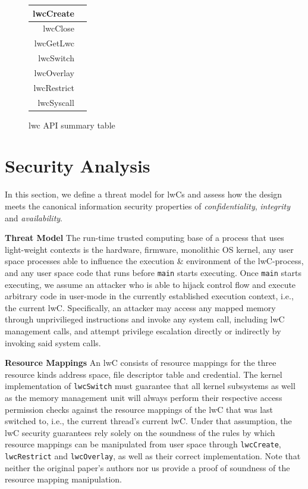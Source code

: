 \documentclass[10pt,twocolumn,letter]{article}
\begin{document}
\begin{figure}[h] %
\centering
\begin{tabular}{|r|m{1.5cm}|}
  \hline
  lwcCreate & \\
  \hline
  lwcClose & \\
  \hline
  lwcGetLwc & \\
  \hline
  lwcSwitch &  \\
  \hline
  lwcOverlay & \\
  \hline
  lwcRestrict & \\
  \hline
  lwcSyscall & \\
  \hline
\end{tabular}
  \caption{lwc API summary table}
\end{figure}


\section{Security Analysis}\label{design:threat}

In this section, we define a threat model for lwCs and assess how the design meets the canonical information security properties of \textit{confidentiality}, \textit{integrity} and \textit{availability}\cite{ciagoals}.

\textbf{Threat Model}\hspace{1em}
The run-time trusted computing base of a process that uses light-weight contexts is the
hardware,
firmware,
monolithic OS kernel,
any user space processes able to influence the execution \& environment of the lwC-process,
and any user space code that runs before \lstinline{main} starts executing.
Once \lstinline{main} starts executing, we assume an attacker who is able to hijack control flow and execute arbitrary code in user-mode in the currently established execution context, i.e., the current lwC.
Specifically, an attacker may access any mapped memory through unprivilieged instructions and invoke any system call, including lwC management calls, and attempt privilege escalation directly or indirectly by invoking said system calls.

\textbf{Resource Mappings}\hspace{1em}
An lwC consists of resource mappings for the three resource kinds address space, file descriptor table and credential.
The kernel implementation of \texttt{lwcSwitch} must guarantee that all kernel subsystems as well as the memory management unit will always perform their respective access permission checks against the resource mappings of the lwC that was last switched to, i.e., the current thread's current lwC.
Under that assumption, the lwC security guarantees rely solely on the soundness of the rules by which resource mappings can be manipulated from user space through \lstinline{lwcCreate}, \lstinline{lwcRestrict} and \lstinline{lwcOverlay}, as well as their correct implementation.
Note that neither the original paper's authors nor us provide a proof of soundness of the resource mapping manipulation.
\end{document}
